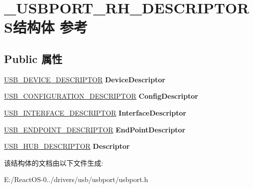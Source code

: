 \hypertarget{struct___u_s_b_p_o_r_t___r_h___d_e_s_c_r_i_p_t_o_r_s}{}\section{\+\_\+\+U\+S\+B\+P\+O\+R\+T\+\_\+\+R\+H\+\_\+\+D\+E\+S\+C\+R\+I\+P\+T\+O\+R\+S结构体 参考}
\label{struct___u_s_b_p_o_r_t___r_h___d_e_s_c_r_i_p_t_o_r_s}
\subsection*{Public 属性}
\begin{DoxyCompactItemize}
\item 
\mbox{\label{struct___u_s_b_p_o_r_t___r_h___d_e_s_c_r_i_p_t_o_r_s_a278b2dc85272c2e9221b9d400594a186}} 
\hyperlink{struct___u_s_b___d_e_v_i_c_e___d_e_s_c_r_i_p_t_o_r}{U\+S\+B\+\_\+\+D\+E\+V\+I\+C\+E\+\_\+\+D\+E\+S\+C\+R\+I\+P\+T\+OR} {\bfseries Device\+Descriptor}
\item 
\mbox{\label{struct___u_s_b_p_o_r_t___r_h___d_e_s_c_r_i_p_t_o_r_s_a82bee23f78af74fbc2ac68ca989c599d}} 
\hyperlink{struct___u_s_b___c_o_n_f_i_g_u_r_a_t_i_o_n___d_e_s_c_r_i_p_t_o_r}{U\+S\+B\+\_\+\+C\+O\+N\+F\+I\+G\+U\+R\+A\+T\+I\+O\+N\+\_\+\+D\+E\+S\+C\+R\+I\+P\+T\+OR} {\bfseries Config\+Descriptor}
\item 
\mbox{\label{struct___u_s_b_p_o_r_t___r_h___d_e_s_c_r_i_p_t_o_r_s_aeca04ff8f5f86e75ffc3cad6f78018cc}} 
\hyperlink{struct___u_s_b___i_n_t_e_r_f_a_c_e___d_e_s_c_r_i_p_t_o_r}{U\+S\+B\+\_\+\+I\+N\+T\+E\+R\+F\+A\+C\+E\+\_\+\+D\+E\+S\+C\+R\+I\+P\+T\+OR} {\bfseries Interface\+Descriptor}
\item 
\mbox{\label{struct___u_s_b_p_o_r_t___r_h___d_e_s_c_r_i_p_t_o_r_s_ad8f3dbf52c4a3d312820143b544363c1}} 
\hyperlink{struct___u_s_b___e_n_d_p_o_i_n_t___d_e_s_c_r_i_p_t_o_r}{U\+S\+B\+\_\+\+E\+N\+D\+P\+O\+I\+N\+T\+\_\+\+D\+E\+S\+C\+R\+I\+P\+T\+OR} {\bfseries End\+Point\+Descriptor}
\item 
\mbox{\label{struct___u_s_b_p_o_r_t___r_h___d_e_s_c_r_i_p_t_o_r_s_a2aa03b7006335ae4517f41ad686fbde4}} 
\hyperlink{struct___u_s_b___h_u_b___d_e_s_c_r_i_p_t_o_r}{U\+S\+B\+\_\+\+H\+U\+B\+\_\+\+D\+E\+S\+C\+R\+I\+P\+T\+OR} {\bfseries Descriptor}
\end{DoxyCompactItemize}


该结构体的文档由以下文件生成\+:\begin{DoxyCompactItemize}
\item 
E\+:/\+React\+O\+S-\/0../drivers/usb/usbport/usbport.\+h\end{DoxyCompactItemize}
